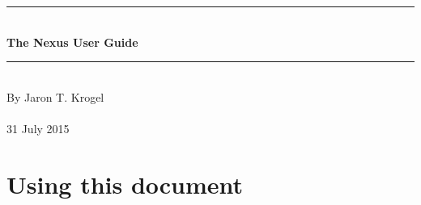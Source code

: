 \documentclass[oneside,11pt]{memoir}
\numberwithin{equation}{section}
\newcommand{\HRule}{\rule{\linewidth}{0.5mm}}
\newenvironment{changemargin}[2]{%
\begin{list}{}{%
\setlength{\leftmargin}{#1}%
\setlength{\rightmargin}{#2}%
}%
\item[]}{\end{list}}
\begin{document}


\thispagestyle{empty}
\begin{changemargin}{-1cm}{-1cm}
  \begin{center}
    \hspace{1cm}\\
    \hspace{1cm}\\
    \hspace{1cm}\\
    \hspace{1cm}\\
    \hspace{1cm}\\
    \hspace{1cm}\\
    \hspace{1cm}\\
    \hspace{1cm}\\
    \hspace{1cm}\\
    \hspace{1cm}\\
    \hspace{1cm}\\
    \hspace{1cm}\\
    \HRule\\
    \vspace{4mm}
    \textbf{\fontsize{40}{45}\selectfont The Nexus User Guide} \\ 
    \HRule\\
    \vspace{1cm}
    \vspace{6cm}
    By Jaron T. Krogel \\
    \hspace{1cm}\\
    31 July 2015
  \end{center}
\end{changemargin}
\pagebreak

\tableofcontents



\mainmatter

\pagebreak
\chapter{Using this document} \label{usedoc}
\end{document}
